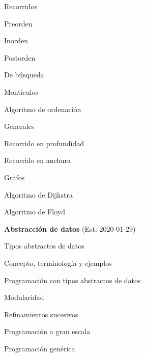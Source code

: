 \begin{longenum}
\begin{longenum}
\begin{longenum}
\begin{longenum}
                \item Recorridos
                \begin{longenum}
                    \item Preorden
                    \item Inorden
                    \item Postorden
                \end{longenum}
            \end{longenum}
            \item De búsqueda
            \item Montículos
            \begin{longenum}
                \item Algoritmo de ordenación
            \end{longenum}
            \item Generales
            \begin{longenum}
                \item Recorrido en profundidad
                \item Recorrido en anchura
            \end{longenum}
        \end{longenum}
        \item Grafos
        \begin{longenum}
            \item Algoritmo de Dijkstra
            \item Algoritmo de Floyd
        \end{longenum}
    \end{longenum}
    \item \textbf{Abstracción de datos}  (Est: 2020-01-29)
    \begin{longenum}
        \item Tipos abstractos de datos
        \begin{longenum}
            \item Concepto, terminología y ejemplos
            \item Programación con tipos abstractos de datos
            \begin{longenum}
                \item Modularidad
                \item Refinamientos sucesivos
                \item Programación a gran escala
                \item Programación genérica

\end{longenum}
\end{longenum}
\end{longenum}
\end{longenum}
